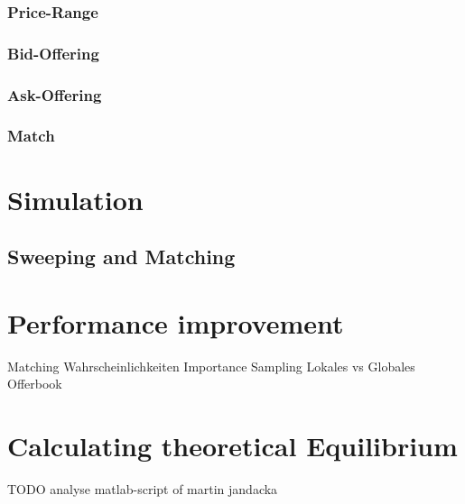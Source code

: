 \documentclass[Bachelorarbeit.tex]{subfiles}
\begin{document}
\subsubsection{Price-Range}
\subsubsection{Bid-Offering}
\subsubsection{Ask-Offering}
\subsubsection{Match}

\section{Simulation}
\subsection{Sweeping and Matching}

\section{Performance improvement}
Matching Wahrscheinlichkeiten
Importance Sampling
Lokales vs Globales Offerbook
		
\section{Calculating theoretical Equilibrium}
TODO analyse matlab-script of martin jandacka
\end{document}
